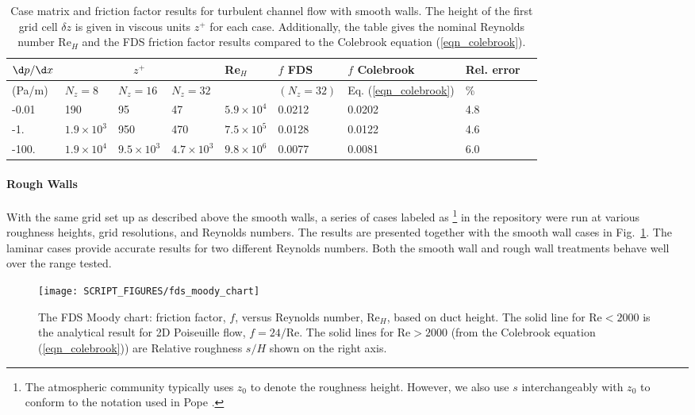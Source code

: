 \documentclass[11pt]{book}
\begin{document}
\begin{table}
\centering
\caption[Case matrix for Moody chart]{Case matrix and friction factor results for turbulent channel flow with smooth walls. The height of the first grid cell $\delta z$ is given in viscous units $z^+$ for each case.  Additionally, the table gives the nominal Reynolds number Re$_H$ and the FDS friction factor results compared to the Colebrook equation (\ref{eqn_colebrook}).}
\begin{tabular}{|*{9}{l|}}
\hline
$\d p/\d x$   & \multicolumn{3}{c|}{$z^+$} &  Re$_H$  & $f$ FDS  & $f$ Colebrook & Rel. error \\
\hline (Pa/m)           & $N_z=8$          & $N_z=16$          & $N_z=32$          &                   & $(N_z=32)$ & Eq. (\ref{eqn_colebrook}) & \% \\
\hline\hline -0.01      & 190              & 95                & 47                & $5.9\times 10^4$  & 0.0212     & 0.0202   & 4.8                 \\
\hline -1.    & $1.9\times 10^3$ & 950               & 470               & $7.5\times 10^5$  & 0.0128     & 0.0122   & 4.6                 \\
\hline -100.  & $1.9\times 10^4$ & $9.5\times 10^3$  & $4.7\times 10^3$  & $9.8\times 10^6$  & 0.0077     & 0.0081   & 6.0                 \\
\hline
\end{tabular}
\label{tab_zplus}
\end{table}

\paragraph{Rough Walls}

With the same grid set up as described above the smooth walls, a series of cases labeled as \footnote{The atmospheric community typically uses $z_0$ to denote the roughness height. However, we also use $s$ interchangeably with $z_0$ to conform to the notation used in Pope \cite{Pope:2000}.} in the repository \cite{FDS-SMV_repository} were run at various roughness heights, grid resolutions, and Reynolds numbers. The results are presented together with the smooth wall cases in Fig.~\ref{fig_fds_moody_chart}. The laminar cases provide accurate results for two different Reynolds numbers. Both the smooth wall and rough wall treatments behave well over the range tested.

\begin{figure}[ht]
\centering
\texttt{[image: SCRIPT\_FIGURES/fds\_moody\_chart]}
\caption[FDS Moody chart]{The FDS Moody chart: friction factor, $f$, versus Reynolds number, Re$_H$, based on duct height. The solid line for $\mbox{Re} < 2000$ is the analytical result for 2D Poiseuille flow, $f=24/\mbox{Re}$. The solid lines for $\mbox{Re}>2000$ (from the Colebrook equation (\ref{eqn_colebrook})) are Relative roughness $s/H$ shown on the right axis.}
\label{fig_fds_moody_chart}
\end{figure}
\end{document}
